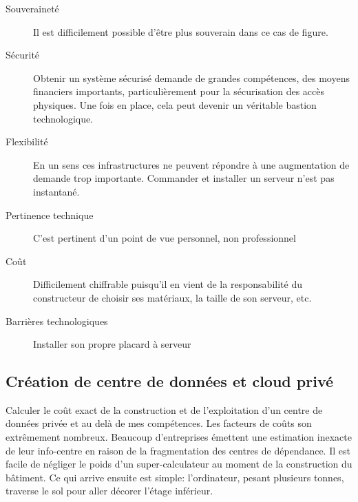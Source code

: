 \documentclass[11pt, a4paper ]{article}
\begin{document}
\begin{spacing}{1.5}
%
\begin{description}
	\item[Souveraineté ]
Il est difficilement possible d'être plus souverain dans ce cas de figure.
	\item[Sécurité]
Obtenir un système sécurisé demande de grandes compétences, des moyens financiers importants, particulièrement pour la sécurisation des accès physiques. Une fois en place, cela peut devenir un véritable bastion technologique.
	\item[Flexibilité]
 En un sens ces infrastructures ne peuvent répondre à une augmentation de demande trop importante. Commander et installer un serveur n'est pas instantané.
	\item[Pertinence technique]
C'est pertinent d'un point de vue personnel, non professionnel
	\item[Coût]
Difficilement chiffrable puisqu'il en vient de la responsabilité du constructeur de choisir ses matériaux, la taille de son serveur, etc.
	\item[Barrières technologiques]
	Installer son propre placard à serveur
\end{description}

			\subsection{Création de centre de données et cloud privé}







Calculer le coût exact de la construction et de l'exploitation d'un centre de données privée et au delà de mes compétences. Les facteurs de coûts son extrêmement nombreux. Beaucoup d'entreprises émettent une estimation inexacte de leur info-centre en raison de la fragmentation des centres de dépendance. Il est facile de négliger le poids d'un super-calculateur au moment de la construction du bâtiment. Ce qui arrive ensuite est simple: l'ordinateur, pesant plusieurs tonnes, traverse le sol pour aller décorer l'étage inférieur.


\end{spacing}
\end{document}
